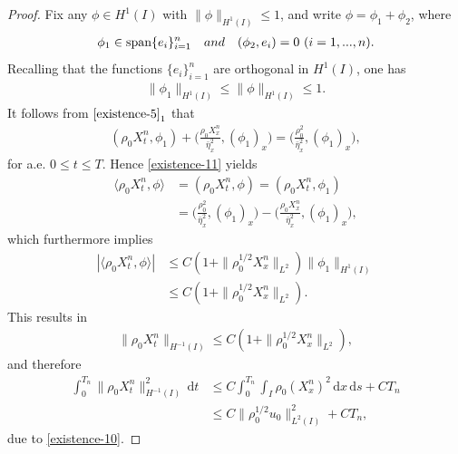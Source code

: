 \documentclass[11pt, reqno]{amsart}
\newcommand{\diff}{\mathrm{d}}
\numberwithin{equation}{section}
\begin{document}
{\begin{proof}
Fix any \(\phi\in H^1(I)\) with \(\|\phi\|_{H^1(I)}\leq 1\), and write \(\phi=\phi_1+\phi_2\), where 
\begin{equation*}
	\begin{aligned}
\phi_1\in \text{span}\{e_i\}_{i=1}^n\quad {\rm{and}}\quad (\phi_2,e_i)=0\ (i=1,...,n).
	\end{aligned}
\end{equation*}
Recalling that the functions \(\{e_i\}_{i=1}^n\) are orthogonal in \(H^1(I)\), one has
\begin{equation*}
	\begin{aligned}
\|\phi_1\|_{H^1(I)}\leq \|\phi\|_{H^1(I)}\leq 1.
	\end{aligned}
\end{equation*}
It follows from \(\eqref{existence-5}_1\)  that 
\begin{equation}\label{existence-11}
	\begin{aligned}
(\rho_0X_t^n, \phi_1)+\bigg(\frac{\rho_0X_x^n}{\bar{\eta}_x^2}, (\phi_1)_x\bigg)=\bigg({\frac{\rho_0^2}{\bar{\eta}_x^2}}, (\phi_1)_x\bigg),
	\end{aligned}
\end{equation}
for a.e. \(0\leq t\leq T\).
Hence \eqref{existence-11} yields 
\begin{equation*}
	\begin{aligned}
\langle\rho_0X_t^n, \phi\rangle
&=(\rho_0X_t^n, \phi)=(\rho_0X_t^n, \phi_1)\\
&=\bigg({\frac{\rho_0^2}{\bar{\eta}_x^2}}, (\phi_1)_x\bigg)-\bigg(\frac{\rho_0X_x^n}{\bar{\eta}_x^2}, (\phi_1)_x\bigg),
	\end{aligned}
\end{equation*}
which furthermore implies 
\begin{equation*}
	\begin{aligned}
		|\langle\rho_0X_t^n, \phi\rangle|&\leq C(1+\|\rho_0^{1/2}X_x^n\|_{L^2})\|\phi_1\|_{H^1(I)}\\
		&\leq C(1+\|\rho_0^{1/2}X_x^n\|_{L^2}).
	\end{aligned}
\end{equation*}
This results in 
\begin{equation*}
	\begin{aligned}
	  \|\rho_0X_t^n\|_{H^{-1}(I)}\leq C(1+\|\rho_0^{1/2}X_x^n\|_{L^2}),
	\end{aligned}
\end{equation*}
and therefore 
\begin{equation}\label{existence-12}
	\begin{aligned}
		\int_0^{T_n}\|\rho_0X_t^n\|_{H^{-1}(I)}^2\,\diff t&\leq C\int_0^{T_n}\int_I\rho_0(X_x^n)^2\,\diff x\,\diff s+CT_n\\
		&\leq C\|\rho_0^{1/2}u_0\|_{L^2(I)}^2+CT_n,
	\end{aligned}
\end{equation}
due to \eqref{existence-10}.



\end{proof}}
\end{document}
